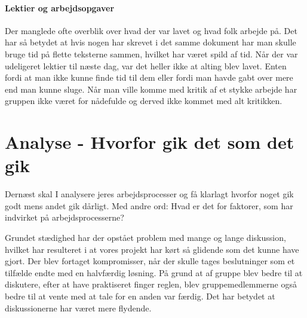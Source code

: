\paragraph{Lektier og arbejdsopgaver}
Der manglede ofte overblik over hvad der var lavet og hvad folk arbejde på. Det har så betydet at hvis nogen har skrevet i det samme dokument har man skulle bruge tid på flette teksterne sammen, hvilket har været spild af tid. Når der var udeligeret lektier til næste dag, var det heller ikke at alting blev lavet. Enten fordi at man ikke kunne finde tid til dem eller fordi man havde gabt over mere end man kunne sluge. Når man ville komme med kritik af et stykke arbejde har gruppen ikke været for nådefulde og derved ikke kommet med alt kritikken. 

\section{Analyse - Hvorfor gik det som det gik}
Dernæst skal I analysere jeres arbejdsprocesser og få klarlagt hvorfor noget gik godt mens andet gik dårligt. Med andre ord: Hvad er det for faktorer, som har indvirket på arbejdsprocesserne? 

Grundet stædighed har der opstået problem med mange og lange diskussion, hvilket har resulteret i at vores projekt har kørt så glidende som det kunne have gjort. Der blev fortaget kompromisser, når der skulle tages beslutninger som et tilfælde endte med en halvfærdig løsning.
På grund at af gruppe blev bedre til at diskutere, efter at have praktiseret finger reglen, blev gruppemedlemmerne også bedre til at vente med at tale for en anden var færdig. Det har betydet at diskussionerne har været mere flydende.

